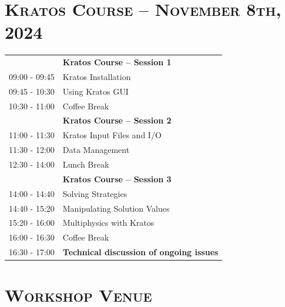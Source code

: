 \documentclass{article}
\begin{document}
\newpage
\section*{\centering \textsc{Kratos Course -- November 8th, 2024}}

\begin{table}[h]\centering
   \begin{tabularx}{0.85\textwidth}{r|X}
      \toprule%
                    & {\large \textbf{Kratos Course -- Session 1}} \\%
      09:00 - 09:45 & Kratos Installation \\%
      09:45 - 10:30 & Using Kratos GUI \\%
      \midrule%
      \rowcolor{SeaGreen3!5!} 10:30 - 11:00 & Coffee Break \\%
      \midrule%
                    & {\large \textbf{Kratos Course -- Session 2}} \\%
      11:00 - 11:30 & Kratos Input Files and I/O \\%
      11:30 - 12:00 & Data Management \\%
      \midrule%
      \rowcolor{SeaGreen3!5!} 12:30 - 14:00 & Lunch Break \\%
      \midrule%
                    & {\large \textbf{Kratos Course -- Session 3}} \\%
      14:00 - 14:40 & Solving Strategies \\%
      14:40 - 15:20 & Manipulating Solution Values \\%
      15:20 - 16:00 & Multiphysics with Kratos \\%
      \midrule%
      \rowcolor{SeaGreen3!5!} 16:00 - 16:30 & Coffee Break \\%
      \midrule%
      16:30 - 17:00 & {\large \textbf{Technical discussion of ongoing issues}} \\%
      \bottomrule
   \end{tabularx}
\end{table}

\newpage
\section*{\centering \textsc{Workshop Venue}}
\end{document}
